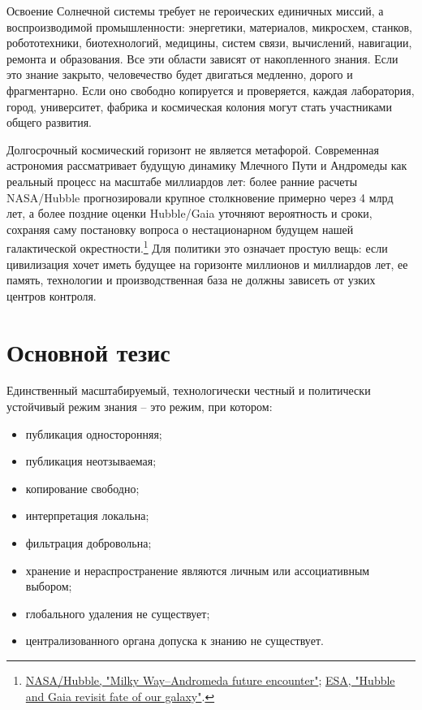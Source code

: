 \documentclass[11pt,a4paper]{article}
\begin{document}
Освоение Солнечной системы требует не героических единичных миссий, а воспроизводимой промышленности: энергетики, материалов, микросхем, станков, робототехники, биотехнологий, медицины, систем связи, вычислений, навигации, ремонта и образования. Все эти области зависят от накопленного знания. Если это знание закрыто, человечество будет двигаться медленно, дорого и фрагментарно. Если оно свободно копируется и проверяется, каждая лаборатория, город, университет, фабрика и космическая колония могут стать участниками общего развития.

Долгосрочный космический горизонт не является метафорой. Современная астрономия рассматривает будущую динамику Млечного Пути и Андромеды как реальный процесс на масштабе миллиардов лет: более ранние расчеты NASA/Hubble прогнозировали крупное столкновение примерно через 4 млрд лет, а более поздние оценки Hubble/Gaia уточняют вероятность и сроки, сохраняя саму постановку вопроса о нестационарном будущем нашей галактической окрестности.\footnote{\href{https://science.nasa.gov/missions/hubble/nasas-hubble-shows-milky-way-is-destined-for-head-on-collision-with-andromeda-galaxy/}{NASA/Hubble, "Milky Way--Andromeda future encounter"}; \href{https://www.esa.int/Science_Exploration/Space_Science/Hubble_and_Gaia_revisit_fate_of_our_galaxy}{ESA, "Hubble and Gaia revisit fate of our galaxy"}.} Для политики это означает простую вещь: если цивилизация хочет иметь будущее на горизонте миллионов и миллиардов лет, ее память, технологии и производственная база не должны зависеть от узких центров контроля.

\section{Основной тезис}

Единственный масштабируемый, технологически честный и политически устойчивый режим знания -- это режим, при котором:

\begin{itemize}
  \item публикация односторонняя;
  \item публикация неотзываемая;
  \item копирование свободно;
  \item интерпретация локальна;
  \item фильтрация добровольна;
  \item хранение и нераспространение являются личным или ассоциативным выбором;
  \item глобального удаления не существует;
  \item централизованного органа допуска к знанию не существует.
\end{itemize}
\end{document}
